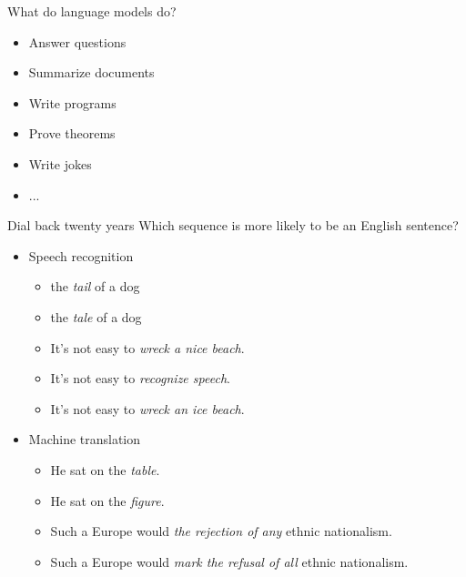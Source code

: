 \documentclass[usenames,dvipsnames,notes,11pt,aspectratio=169,hyperref={colorlinks=true, linkcolor=blue}]{beamer}
\newcommand{\pdfnote}[1]{}
\begin{document}
\begin{frame}
    {What do language models do?}

            \begin{itemize}
                \item Answer questions 
                \item Summarize documents 
                \item Write programs 
                \item Prove theorems
                \item Write jokes
                \item ...
            \end{itemize}
\end{frame}

\begin{frame}
    {Dial back twenty years}
    Which sequence is more likely to be an English sentence?
    \begin{itemize}
        \item Speech recognition
            \begin{itemize}
                \item[] the \textit{tail} of a dog
                \item[] the \textit{tale} of a dog
            \end{itemize}
            \begin{itemize}
                \item[] It's not easy to \textit{wreck a nice beach}. 
                \item[] It's not easy to \textit{recognize speech}. 
                \item[] It's not easy to \textit{wreck an ice beach}.
            \end{itemize}
        \item Machine translation 
            \begin{itemize}
                \item[] He sat on the \textit{table}.
                \item[] He sat on the \textit{figure}.
            \end{itemize}
            \begin{itemize}
                \item[] Such a Europe would \textit{the rejection of any} ethnic nationalism. 
                \item[] Such a Europe would \textit{mark the refusal of all} ethnic nationalism. 
            \end{itemize}
    \end{itemize}
    \pdfnote{
        In earlier systems of speech recognition and machine translation,
        the acousitic model and the translation model would produce multiple rough translations, and the language model is used to reweight these outputs by how likely they are English sentences.
    }
\end{frame}
\end{document}
